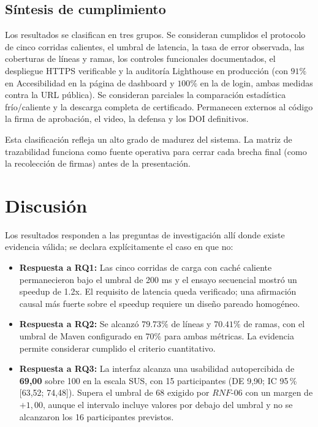\documentclass[11pt,a4paper]{report}
\begin{document}
\section{Síntesis de cumplimiento}
Los resultados se clasifican en tres grupos. Se consideran cumplidos el protocolo de cinco corridas calientes, el umbral de latencia, la tasa de error observada, las coberturas de líneas y ramas, los controles funcionales documentados, el despliegue HTTPS verificable y la auditoría Lighthouse en producción (con $91\%$ en Accesibilidad en la página de dashboard y $100\%$ en la de login, ambas medidas contra la URL pública). Se consideran parciales la comparación estadística frío/caliente y la descarga completa de certificado. Permanecen externos al código la firma de aprobación, el video, la defensa y los DOI definitivos.

Esta clasificación refleja un alto grado de madurez del sistema. La matriz de trazabilidad funciona como fuente operativa para cerrar cada brecha final (como la recolección de firmas) antes de la presentación.

\chapter{Discusión}
Los resultados responden a las preguntas de investigación allí donde existe evidencia válida; se declara explícitamente el caso en que no:
\begin{itemize}
    \item \textbf{Respuesta a RQ1:} Las cinco corridas de carga con caché caliente permanecieron bajo el umbral de 200 ms y el ensayo secuencial mostró un speedup de 1.2x. El requisito de latencia queda verificado; una afirmación causal más fuerte sobre el speedup requiere un diseño pareado homogéneo.
    \item \textbf{Respuesta a RQ2:} Se alcanzó $79.73\%$ de líneas y $70.41\%$ de ramas, con el umbral de Maven configurado en 70\% para ambas métricas. La evidencia permite considerar cumplido el criterio cuantitativo.
    \item \textbf{Respuesta a RQ3:} La interfaz alcanza una usabilidad autopercibida de \textbf{69,00} sobre 100 en la escala SUS, con 15 participantes (DE 9,90; IC 95\,\% [63,52; 74,48]). Supera el umbral de 68 exigido por $RNF\text{-}06$ con un margen de $+1,00$, aunque el intervalo incluye valores por debajo del umbral y no se alcanzaron los 16 participantes previstos.
\end{itemize}
\end{document}
